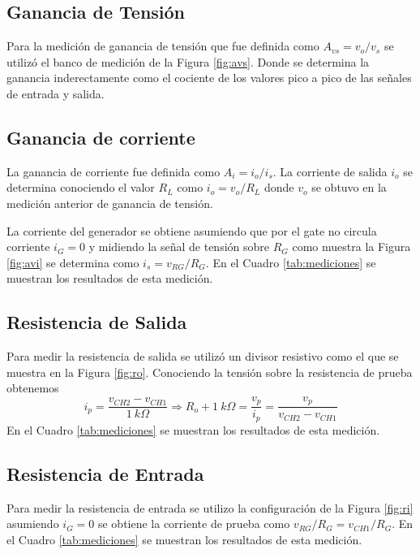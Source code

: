 \documentclass[a4paper, 10pt, spanish]{article}
\begin{document}
\subsection{Ganancia de Tensión}



Para la medición de ganancia de tensión que fue definida como $A_{vs} = v_o/v_s$ se utilizó el banco de medición de la Figura \ref{fig:avs}. Donde se determina la ganancia inderectamente como el cociente de los valores pico a pico de las señales de entrada y salida.




\subsection{Ganancia de corriente}

La ganancia de corriente fue definida como $A_i = i_o/ i_s$. La corriente de salida $i_o$ se determina conociendo el valor $R_L$ como $i_o = v_o/R_L$ donde $v_o$ se obtuvo en la medición anterior de ganancia de tensión.


La corriente del generador se obtiene asumiendo que por el gate no circula corriente $i_G = 0$ y midiendo la señal de tensión sobre $R_G$ como muestra la Figura \ref{fig:avi} se determina como $i_s = v_{RG}/R_G$. En el Cuadro \ref{tab:mediciones} se muestran los resultados de esta medición.

\subsection{Resistencia de Salida}

Para medir la resistencia de salida se utilizó un divisor resistivo como el que se muestra en la Figura \ref{fig:ro}. Conociendo la tensión sobre la resistencia de prueba obtenemos
\begin{equation}
	i_p = \frac{v_{CH2}-v_{CH1}}{1\ k\Omega} \Rightarrow R_o + 1\ k\Omega = \frac{v_p}{i_p} = \frac{v_p}{v_{CH2}-v_{CH1}}
	\end{equation}
En el Cuadro \ref{tab:mediciones} se muestran los resultados de esta medición.

\subsection{Resistencia de Entrada}

Para medir la resistencia de entrada se utilizo la configuración de la Figura \ref{fig:ri} asumiendo $i_G = 0$ se obtiene la corriente de prueba como $v_{RG}/R_G = v_{CH1}/R_G$.
En el Cuadro \ref{tab:mediciones} se muestran los resultados de esta medición.
\end{document}
